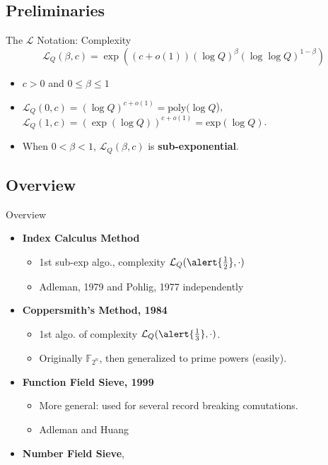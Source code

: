 \documentclass{beamer}
\begin{document}
	\subsection{Preliminaries}
		\begin{frame}{The $\mathcal{L}$ Notation: Complexity}
			$$\mathcal{L}_Q(\beta, c) = \exp((c + o(1))(\log Q)^\beta (\log\log Q)^{1-\beta})$$
			\begin{itemize}
				\item 
					$c>0$ and $0 \le \beta \le 1$
				\item
					$\mathcal{L}_Q(0, c) = (\log Q)^{c + o(1)} = \text{poly}(\log Q$),\\
					$\mathcal{L}_Q(1, c) = (\exp(\log Q))^{c+o(1)} = \text{exp}(\log Q)$. 
				\item
					When $0<\beta<1$, $\mathcal{L}_Q(\beta, c)$ is \textbf{sub-exponential}.
			\end{itemize}
		\end{frame}
	\subsection{Overview}		
		\begin{frame}{Overview}
			\begin{itemize}
				\item
					\textbf{Index Calculus Method}
						\begin{itemize}
							\item
								1st sub-exp algo., complexity $\mathcal{L}_Q(\alert{\frac{1}{2}}, \cdot)$
							\item
								Adleman, 1979 and Pohlig, 1977 independently
						\end{itemize}
				\item
					\textbf{Coppersmith's Method, 1984}
						\begin{itemize}
							\item
								1st algo. of complexity $\mathcal{L}_Q(\alert{\frac{1}{3}}, \cdot)$.
							\item
								Originally $\mathbb{F}_{2^n}$, then generalized to prime powers (easily).
						\end{itemize}
				\item
					\textbf{Function Field Sieve, 1999}
						\begin{itemize}
							\item
								More general: used for several record breaking comutations.
							\item
								Adleman and Huang
						\end{itemize}
				\item
					\textbf{Number Field Sieve}, 
			\end{itemize}
		\end{frame}
		
\end{document}
